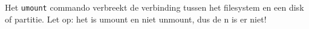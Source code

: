 Het \texttt{umount} commando verbreekt de verbinding tussen het filesystem en een disk of partitie. Let op: het is umount en niet unmount, dus de n is er niet!

